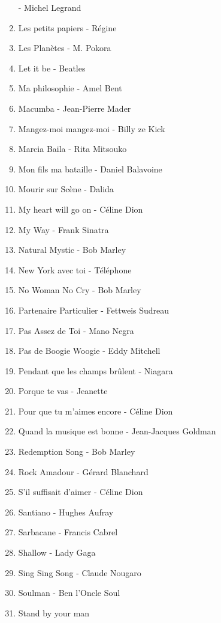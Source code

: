 \documentclass[12pt]{extarticle}
\begin{document}
\begin{multicols}{2}
\begin{enumerate}[nolistsep]
        - Michel Legrand
\item   Les petits papiers
        - Régine
\item   Les Planètes
        - M. Pokora
\item   Let it be
        - Beatles
\item   Ma philosophie
        - Amel Bent
\item   Macumba
        - Jean-Pierre Mader
\item   Mangez-moi mangez-moi
        - Billy ze Kick
\item   Marcia Baila
        - Rita Mitsouko
\item   Mon fils ma bataille
        - Daniel Balavoine
\item   Mourir sur Scène
        - Dalida
\item   My heart will go on
        - Céline Dion
\item   My Way
        - Frank Sinatra
\item   Natural Mystic
        - Bob Marley
\item   New York avec toi
        - Téléphone
\item   No Woman No Cry
        - Bob Marley
\item   Partenaire Particulier
        - Fettweis Sudreau
\item   Pas Assez de Toi
        - Mano Negra
\item   Pas de Boogie Woogie
        - Eddy Mitchell
\item   Pendant que les champs brûlent
        - Niagara
\item   Porque te vas
        - Jeanette
\item   Pour que tu m'aimes encore
        - Céline Dion
\item   Quand la musique est bonne
        - Jean-Jacques Goldman
\item   Redemption Song
        - Bob Marley
\item   Rock Amadour
        - Gérard Blanchard
\item   S'il suffisait d'aimer
        - Céline Dion
\item   Santiano
        - Hughes Aufray
\item   Sarbacane
        - Francis Cabrel
\item   Shallow
        - Lady Gaga
\item   Sing Sing Song
        - Claude Nougaro
\item   Soulman
        - Ben l'Oncle Soul
\item   Stand by your man

\end{enumerate}
\end{multicols}
\end{document}
